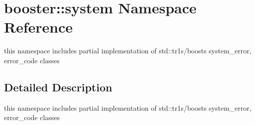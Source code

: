 \section{booster\+:\+:system Namespace Reference}
\label{namespacebooster_1_1system}


this namespace includes partial implementation of std\+::tr1\textquotesingle{}s/boost\textquotesingle{}s system\+\_\+error, error\+\_\+code classes  




\subsection{Detailed Description}
this namespace includes partial implementation of std\+::tr1\textquotesingle{}s/boost\textquotesingle{}s system\+\_\+error, error\+\_\+code classes 